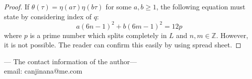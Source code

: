 \documentclass{article}
\begin{document}
\begin{proof}
If $\theta(\tau) = \eta(a\tau)\eta(b\tau)$ for some $a, b \geq 1$, the following equation must state by considering index of $q$:
\begin{equation}
a(6n-1)^{2} + b(6m-1)^{2} = 12p
\end{equation}
where $p$ is a prime number which splits completely in $L$ and $n, m\in \mathbb{Z}$. However, it is not possible. The reader can confirm this easily by using spread sheet.
\end{proof}


--- The contact information of the author---
\\
email: canjinana@me.com
\\
\end{document}
